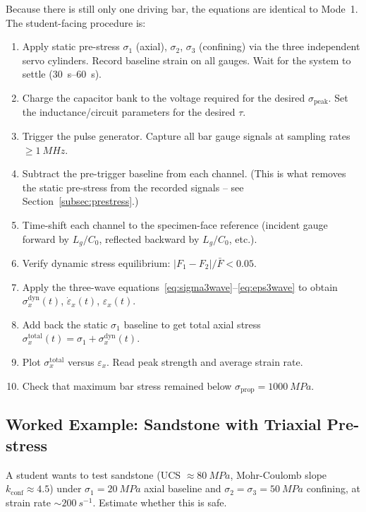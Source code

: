 \documentclass[11pt,a4paper]{article}
\providecommand{\SI}[2]{\qty{#1}{#2}}
\providecommand{\SIrange}[3]{\qtyrange{#1}{#2}{#3}}
\newcommand{\sig}{\sigma}
\newcommand{\eps}{\varepsilon}
\newcommand{\epsdot}{\dot\eps}
\newcommand{\Cz}{C_0}
\newcommand{\sigprop}{\sig_{\text{prop}}}
\newcommand{\sigpeak}{\sig_{\text{peak}}}
\begin{document}
Because there is still only one driving bar, the equations are identical to
Mode~1. The student-facing procedure is:
\begin{stepbox}
\begin{enumerate}[leftmargin=*, itemsep=3pt]
  \item Apply static pre-stress $\sig_1$ (axial), $\sig_2$, $\sig_3$ (confining)
        via the three independent servo cylinders. Record baseline strain on all
        gauges. Wait for the system to settle (\SIrange{30}{60}{s}).
  \item Charge the capacitor bank to the voltage required for the desired
        $\sigpeak$. Set the inductance/circuit parameters for the desired $\tau$.
  \item Trigger the pulse generator. Capture all bar gauge signals at sampling
        rates $\geq \SI{1}{MHz}$.
  \item Subtract the pre-trigger baseline from each channel. (This is what
        removes the static pre-stress from the recorded signals -- see
        Section~\ref{subsec:prestress}.)
  \item Time-shift each channel to the specimen-face reference (incident gauge
        forward by $L_g/\Cz$, reflected backward by $L_g/\Cz$, etc.).
  \item Verify dynamic stress equilibrium: $|F_1 - F_2|/\bar F < 0.05$.
  \item Apply the three-wave equations~\eqref{eq:sigma3wave}--\eqref{eq:eps3wave}
        to obtain $\sig_x^{\text{dyn}}(t)$, $\epsdot_x(t)$, $\eps_x(t)$.
  \item Add back the static $\sig_1$ baseline to get total axial stress
        $\sig_x^{\text{total}}(t) = \sig_1 + \sig_x^{\text{dyn}}(t)$.
  \item Plot $\sig_x^{\text{total}}$ versus $\eps_x$. Read peak strength and
        average strain rate.
  \item Check that maximum bar stress remained below $\sigprop = \SI{1000}{MPa}$.
\end{enumerate}
\end{stepbox}

\subsection{Worked Example: Sandstone with Triaxial Pre-stress}

A student wants to test sandstone (UCS $\approx \SI{80}{MPa}$, Mohr-Coulomb slope
$k_{\text{conf}} \approx 4.5$) under
$\sig_1 = \SI{20}{MPa}$ axial baseline and $\sig_2 = \sig_3 = \SI{50}{MPa}$
confining, at strain rate $\sim \SI{200}{s^{-1}}$. Estimate whether this is safe.
\end{document}
